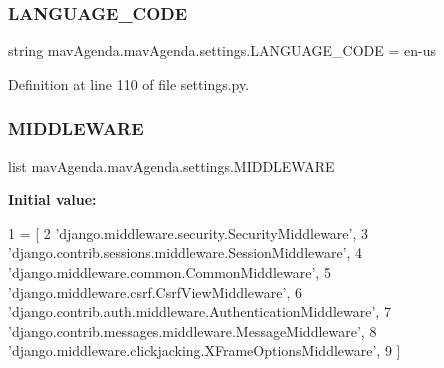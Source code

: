 \mbox{\label{namespacemavAgenda_1_1mavAgenda_1_1settings_ad7952a2ee938e38fe5569abad32d3dda}} 
\subsubsection{\texorpdfstring{L\+A\+N\+G\+U\+A\+G\+E\+\_\+\+C\+O\+DE}{LANGUAGE\_CODE}}
{\footnotesize\ttfamily string mav\+Agenda.\+mav\+Agenda.\+settings.\+L\+A\+N\+G\+U\+A\+G\+E\+\_\+\+C\+O\+DE = \textquotesingle{}en-\/us\textquotesingle{}}



Definition at line 110 of file settings.\+py.

\mbox{\label{namespacemavAgenda_1_1mavAgenda_1_1settings_af9a82d96da5e11b79f4d87886a52c8d5}} 
\subsubsection{\texorpdfstring{M\+I\+D\+D\+L\+E\+W\+A\+RE}{MIDDLEWARE}}
{\footnotesize\ttfamily list mav\+Agenda.\+mav\+Agenda.\+settings.\+M\+I\+D\+D\+L\+E\+W\+A\+RE}

{\bfseries Initial value\+:}
\begin{DoxyCode}
1 =  [
2     \textcolor{stringliteral}{'django.middleware.security.SecurityMiddleware'},
3     \textcolor{stringliteral}{'django.contrib.sessions.middleware.SessionMiddleware'},
4     \textcolor{stringliteral}{'django.middleware.common.CommonMiddleware'},
5     \textcolor{stringliteral}{'django.middleware.csrf.CsrfViewMiddleware'},
6     \textcolor{stringliteral}{'django.contrib.auth.middleware.AuthenticationMiddleware'},
7     \textcolor{stringliteral}{'django.contrib.messages.middleware.MessageMiddleware'},
8     \textcolor{stringliteral}{'django.middleware.clickjacking.XFrameOptionsMiddleware'},
9 ]
\end{DoxyCode}



